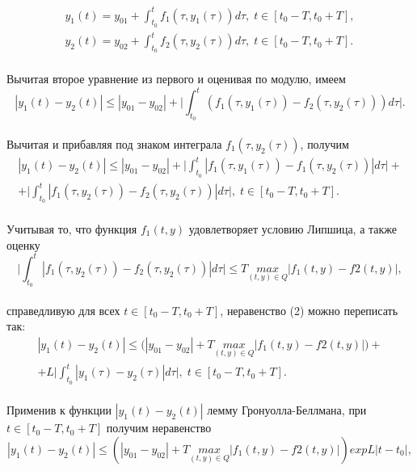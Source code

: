\begin{equation*}
\begin{split}
y_1(t)=y_{01}+\int_{t_0}^t f_1(\tau , y_1(\tau))d\tau , \;t\in [t_0-T, t_0+T],\\
y_2(t)=y_{02}+\int_{t_0}^t f_2(\tau , y_2(\tau))d\tau , \;t\in [t_0-T, t_0+T].
\end{split}
\end{equation*}\\
Вычитая второе уравнение из первого и оценивая по модулю, имеем
\begin{equation*}
|y_1(t)-y_2(t)|\leq |y_{01}-y_{02}|+\big| \int_{t_0}^t (f_1(\tau , y_1(\tau))- f_2(\tau , y_2(\tau)))d\tau \big|.
\end{equation*}\\
Вычитая и прибавляя под знаком интеграла $f_1(\tau,y_2(\tau))$, получим
\begin{equation*}\tag{2}
\begin{split}
|y_1(t)-y_2(t)|\leq |y_{01}-y_{02}|+\big| \int_{t_0}^t |f_1(\tau , y_1(\tau))- f_1(\tau , y_2(\tau))|d\tau \big| +\\
+\big| \int_{t_0}^t |f_1(\tau , y_2(\tau))- f_2(\tau , y_2(\tau))|d\tau \big|,\; t\in [t_0-T, t_0+T].    
\end{split}
\end{equation*}\\
Учитывая то, что функция $f_1(t,y)$ удовлетворяет условию Липшица, а также оценку
\begin{equation*}
\big| \int_{t_0}^t |f_1(\tau , y_2(\tau))- f_2(\tau , y_2(\tau))|d\tau \big|\leq T \underset{(t,y)\in Q}{max} |f_1(t,y)-f2(t,y)|,
\end{equation*}\\
справедливую для всех $t\in [t_0-T,t_0+T]$, неравенство (2) можно переписать так:
\begin{equation*}
\begin{split}
|y_1(t)-y_2(t)|\leq \big( |y_{01}-y_{02}|+  T \underset{(t,y)\in Q}{max} |f_1(t,y)-f2(t,y)|\big)+\\
+L \big| \int_{t_0}^t |y_1(\tau)- y_2(\tau)|d\tau \big|, \;t\in [t_0-T,t_0+T].
\end{split}
\end{equation*}\\
Применив к функции $|y_1(t)-y_2(t)|$ лемму Гронуолла-Беллмана, при $t\in [t_0-T,t_0+T]$ получим неравенство
\begin{equation*}
|y_1(t)-y_2(t)|\leq (|y_{01}-y_{02}|+  T \underset{(t,y)\in Q}{max} |f_1(t,y)-f2(t,y)|) exp{L|t-t_0|},
\end{equation*}
